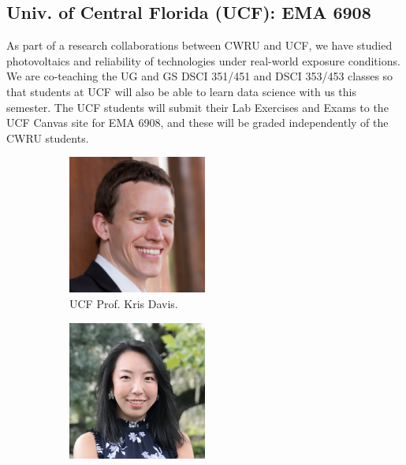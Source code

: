 \documentclass[10pt]{article} %
\begin{document}
  \subsection{Univ. of Central Florida (UCF): EMA 6908}

    As part of a research collaborations between CWRU and UCF, we have studied photovoltaics and reliability of technologies under real-world exposure conditions.  We are co-teaching the UG and GS DSCI 351/451 and DSCI 353/453 classes so that students at UCF will also be able to learn data science with us this semester. The UCF students will submit their Lab Exercises and Exams to the UCF Canvas site for EMA 6908, and these will be graded independently of the CWRU students.

    \begin{figure}[htbp]
      \centering
      \begin{subfigure}{0.3\linewidth}
        \centering
        \includegraphics[width=0.5\textwidth]{figs/Kris_Davis.png}
        \caption{UCF Prof. Kris Davis.}
        \label{fig:davis}
      \end{subfigure}
      \hfill
      \begin{subfigure}{0.3\linewidth}
        \centering
        \includegraphics[width=0.5\textwidth]{figs/Mengjie_Li.jpg}

\end{subfigure}
\end{figure}
\end{document}
